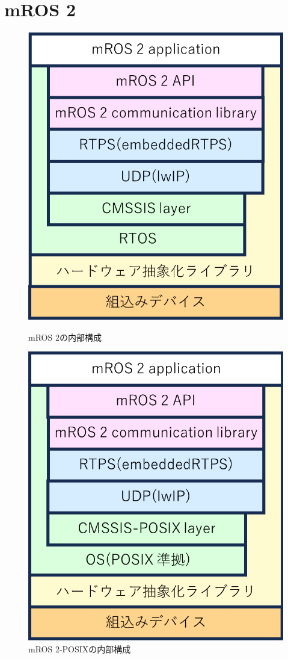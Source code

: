 \section{mROS 2}
\begin{figure}[ht]
    \centering
    \begin{minipage}{.48\textwidth}
        \centering
        \includegraphics[width=0.9\linewidth]{images/fig1_mros2_b.png}
        \caption{mROS 2の内部構成}
        \label{fig:subfig_a}
    \end{minipage}
    \hfill
    \begin{minipage}{.48\textwidth}
        \centering
        \includegraphics[width=0.9\linewidth]{images/fig1_mros2posix_a.png}
        \caption{mROS 2-POSIXの内部構成}
        \label{fig:subfig_b}
    \end{minipage}
\end{figure}
